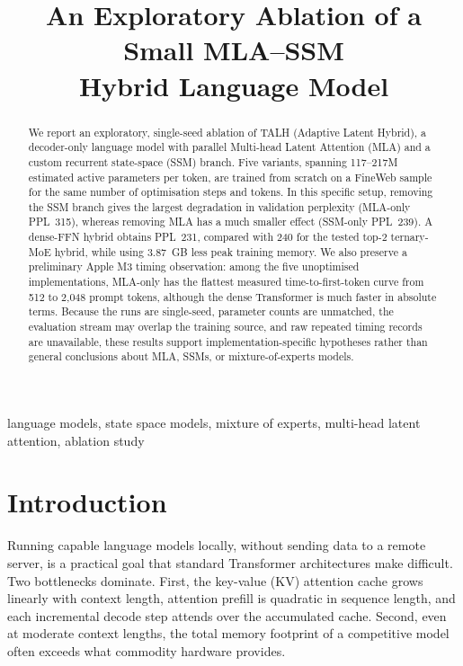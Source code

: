 \documentclass[conference]{IEEEtran}
\title{An Exploratory Ablation of a Small MLA--SSM\\Hybrid Language Model}
\author{
  \IEEEauthorblockN{Christos Koutsiaris}
  \IEEEauthorblockA{Development Expert, SAP P\&E, Cloud ERP, UX Foundation\\
  christos.koutsiaris@sap.com\\
  Code and data: \url{https://github.com/unseen1980/talh}}
}
\begin{document}
\maketitle

\begin{abstract}
We report an exploratory, single-seed ablation of TALH (Adaptive Latent Hybrid),
a decoder-only language model with parallel Multi-head Latent Attention (MLA)
and a custom recurrent state-space (SSM) branch. Five variants, spanning
117--217M estimated active parameters per token, are trained from scratch on a
FineWeb sample for the same number of optimisation steps and tokens. In this
specific setup, removing the SSM branch gives the largest degradation in
validation perplexity (MLA-only PPL~315), whereas removing MLA has a much smaller
effect (SSM-only PPL~239). A dense-FFN hybrid obtains PPL~231, compared with 240
for the tested top-2 ternary-MoE hybrid, while using 3.87~GB less peak training
memory. We also preserve a preliminary Apple M3 timing observation: among the
five unoptimised implementations, MLA-only has the flattest measured
time-to-first-token curve from 512 to 2{,}048 prompt tokens, although the dense
Transformer is much faster in absolute terms. Because the runs are single-seed,
parameter counts are unmatched, the evaluation stream may overlap the training
source, and raw repeated timing records are unavailable, these results support
implementation-specific hypotheses rather than general conclusions about MLA,
SSMs, or mixture-of-experts models.
\end{abstract}

\begin{IEEEkeywords}
language models, state space models, mixture of experts, multi-head latent
attention, ablation study
\end{IEEEkeywords}


\section{Introduction}

Running capable language models locally, without sending data to a remote
server, is a practical goal that standard Transformer architectures make
difficult. Two bottlenecks dominate. First, the key-value (KV) attention
cache grows linearly with context length, attention prefill is quadratic in
sequence length, and each incremental decode step attends over the accumulated
cache. Second, even at moderate context lengths, the total memory
footprint of a competitive model often exceeds what commodity hardware provides.
\end{document}
